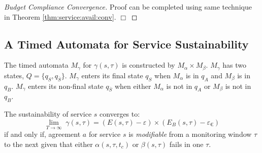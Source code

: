 \begin{proof}[Budget Compliance Convergence]
Proof can be completed using same technique in Theorem \ref{thm:service:avail:conv}.
\newline$\Box$
\end{proof}

\subsection{A Timed Automata for Service Sustainability}
\label{sec:sustain}

The timed automata $M_\gamma$ for $\gamma(s,\tau)$ is constructed by $M_\alpha \times M_\beta$.
$M_\gamma$ has two states, $Q = \{ q_S, q_{\overline{S}}\}$.
$M_\gamma$ enters its final state $q_S$ when $M_\alpha$ is in $q_A$ and $M_\beta$ is in $q_B$.
$M_\gamma$ enters its non-final state $q_{\overline{S}}$ when either $M_\alpha$ is not in $q_A$ or $M_\beta$ is not in $q_B$.

\begin{theorem}
\label{thm:sustain:conv}
The sustainability of service $s$ converges to:
$$
\lim_{T \to \infty} \; \gamma(s, \tau) = (E(s,\tau) - \varepsilon) \times (E_B(s,\tau) - \varepsilon_{\euro})
$$
if and only if, agreement $a$ for service $s$ is \emph{modifiable} from a monitoring window $\tau$ to the next given that either $\alpha(s,\tau,t_c)$ or $\beta(s,\tau)$ fails in one $\tau$.
\end{theorem}

